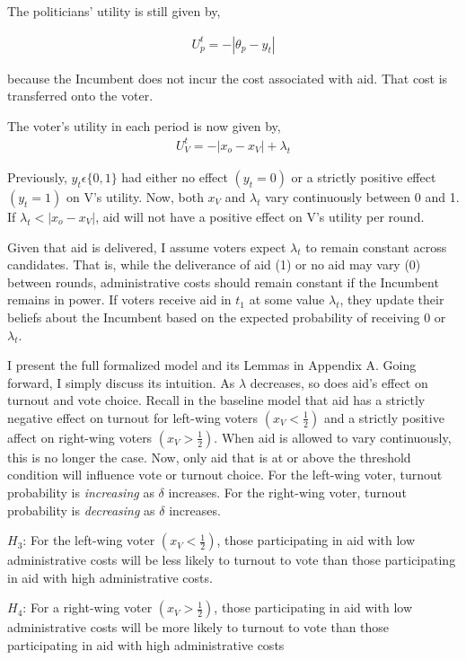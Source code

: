 \documentclass[12pt]{paper}
\begin{document}
The politicians’ utility is still given by,

\begin{gather}
U_{p}^t = -|\theta_p - y_t|
\end{gather}

because the Incumbent does not incur the cost associated with aid. That cost is transferred onto the voter.

The voter’s utility in each period is now given by, 
\begin{gather}
U_{V}^t = -|x_o - x_V| + \lambda_t
\end{gather}

Previously, $y_t \epsilon \{0,1\}$ had either no effect $(y_t = 0)$ or a strictly positive effect $(y_t = 1)$ on V's utility. Now, both $x_V$ and $\lambda_t$ vary continuously between 0 and 1. If $\lambda_t < |x_o - x_V|$, aid will not have a positive effect on V’s utility per round. 

Given that aid is delivered, I assume voters expect $\lambda_t$ to remain constant across candidates. That is, while the deliverance of aid (1) or no aid may vary (0) between rounds, administrative costs should remain constant if the Incumbent remains in power. If voters receive aid in $t_1$ at some value $\lambda_t$, they update their beliefs about the Incumbent based on the expected probability of receiving 0 or $\lambda_t$.

I present the full formalized model and its Lemmas in Appendix A. Going forward, I simply discuss its intuition. As $\lambda$ decreases, so does aid's effect on turnout and vote choice. Recall in the baseline model that aid has a strictly negative effect on turnout for left-wing voters $(x_V < \frac{1}{2})$ and a strictly positive affect on right-wing voters $(x_V > \frac{1}{2})$. When aid is allowed to vary continuously, this is no longer the case. Now, only aid that is at or above the threshold condition will influence vote or turnout choice. For the left-wing voter, turnout probability is \textit{increasing} as $\delta$ increases. For the right-wing voter, turnout probability is \textit{decreasing} as $\delta$ increases.

$H_3$: For the left-wing voter $(x_V < \frac{1}{2})$, those participating in aid with low administrative costs will be less likely to turnout to vote than those participating in aid with high administrative costs.

$H_4$: For a right-wing voter $(x_V > \frac{1}{2})$, those participating in aid with low administrative costs will be more likely to turnout to vote than those participating in aid with high administrative costs
\end{document}
